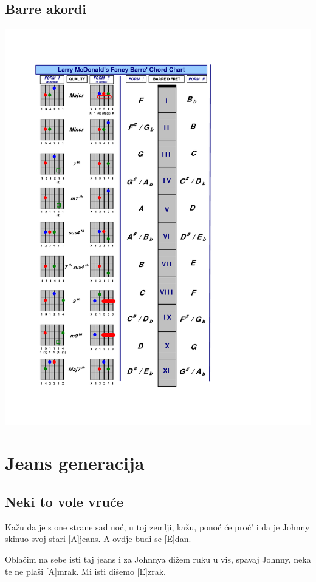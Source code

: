 \documentclass[a4paper,12pt]{article}
\begin{document}
\begin{multicols}{2}
\subsection*{Barre akordi}
\includegraphics[width=140mm]{img/barre.png}
\clearpage
\section{Jeans generacija}
\subsection*{Neki to vole vruće}
\begin{guitar}
[E]Kažu da je s one strane sad noć,
u toj zemlji, kažu, ponoć će proć'
i da je Johnny skinuo svoj stari [A]jeans.
A ovdje budi se [E]dan.


Oblačim na sebe isti taj jeans
i za Johnnya dižem ruku u vis,
spavaj Johnny, neka te ne plaši [A]mrak.
Mi isti dišemo [E]zrak.




\end{guitar}
\end{multicols}
\end{document}
